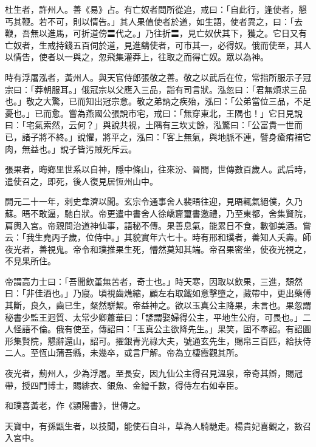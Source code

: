 \begin{pinyinscope}
 杜生者，許州人。善《易》占。有亡奴者問所從追，戒曰：「自此行，逢使者，懇丐其鞭。若不可，則以情告。」其人果值使者於道，如生語，使者異之，曰：「去鞭，吾無以進馬，可折道傍〓代之。」乃往折〓，見亡奴伏其下，獲之。它日又有亡奴者，生戒持錢五百伺於道，見進鷂使者，可市其一，必得奴。俄而使至，其人以情告，使者以一與之，忽飛集灌莽上，往取之而得亡奴。眾以為神。



 時有浮屠泓者，黃州人。與天官侍郎張敬之善。敬之以武后在位，常指所服示子冠宗曰：「莽朝服耳。」俄冠宗以父應入三品，詣有司言狀。泓忽曰：「君無煩求三品也。」敬之大驚，已而知出冠宗意。敬之弟訥之疾殆，泓曰：「公弟當位三品，不足憂也。」已而愈。嘗為燕國公張說市宅，戒曰：「無穿東北，王隅也！」它日見說曰：「宅氣索然，云何？」與說共視，土隅有三坎丈餘，泓驚曰：「公富貴一世而已，諸子將不終。」說懼，將平之，泓曰：「客上無氣，與地脈不連，譬身瘡痏補它肉，無益也。」說子皆污賊死斥云。



 張果者，晦鄉里世系以自神，隱中條山，往來汾、晉間，世傳數百歲人。武后時，遣使召之，即死，後人復見居恆州山中。



 開元二十一年，刺史韋濟以聞。玄宗令通事舍人裴晤往迎，見晤輒氣絕僕，久乃蘇。晤不敢逼，馳白狀。帝更遣中書舍人徐嶠齎璽書邀禮，乃至東都，舍集賢院，肩輿入宮。帝親問治道神仙事，語秘不傳。果善息氣，能累日不食，數御美酒。嘗云：「我生堯丙子歲，位侍中。」其貌實年六七十。時有邢和璞者，善知人夭壽。師夜光者，善視鬼。帝令和璞推果生死，懵然莫知其端。帝召果密坐，使夜光視之，不見果所住。



 帝謂高力士曰：「吾聞飲堇無苦者，奇士也。」時天寒，因取以飲果，三進，頹然曰：「非佳酒也。」乃寢。頃視齒燋縮，顧左右取鐵如意擊墮之，藏帶中，更出藥傅其斷，良久，齒已生，粲然駢絜。帝益神之。欲以玉真公主降果，未言也。果忽謂秘書少監王迥質、太常少卿蕭華曰：「諺謂娶婦得公主，平地生公府，可畏也。」二人怪語不倫。俄有使至，傳詔曰：「玉真公主欲降先生。」果笑，固不奉詔。有詔圖形集賢院，懇辭還山，詔可。擢銀青光祿大夫，號通玄先生，賜帛三百匹，給扶侍二人。至恆山蒲吾縣，未幾卒，或言尸解。帝為立棲霞觀其所。



 夜光者，薊州人，少為浮屠。至長安，因九仙公主得召見溫泉，帝奇其辯，賜冠帶，授四門博士，賜緋衣、銀魚、金繒千數，得侍左右如幸臣。



 和璞喜黃老，作《潁陽書》，世傳之。



 天寶中，有孫甑生者，以技聞，能使石自斗，草為人騎馳走。楊貴妃喜觀之，數召入宮中。




\end{pinyinscope}

